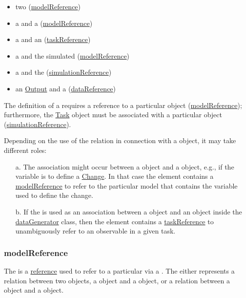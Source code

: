 \begin{itemize}
	\item{two \Models (\hyperref[sec:modelReference]{modelReference})}
	\item{a \Variable and a \Model (\hyperref[sec:modelReference]{modelReference})}
	\item{a \Variable and an \AbstractTask (\hyperref[sec:taskReference]{taskReference})}
	\item{a \Task and the simulated \Model (\hyperref[sec:modelReference]{modelReference})}
	\item{a \Task and the \Simulation (\hyperref[sec:simulationReference]{simulationReference})}
	\item{an \hyperref[class:output]{Output} and a \DataGenerator (\hyperref[sec:dataReference]{dataReference})}
\end{itemize}

The definition of a \Task requires a reference to a particular \Model object (\hyperref[sec:modelReference]{modelReference}); furthermore, the \hyperref[class:abstractTask]{Task} object must be associated with a particular \Simulation object (\hyperref[sec:simulationReference]{simulationReference}).

Depending on the use of the  relation in connection with a \Variable object, it may take different roles: 

\begin{enumerate}
\item[a.]{The  association might occur between a \Variable object and a \Model object, e.g., if the variable is to define a \hyperref[class:change]{Change}. 
In that case the  element contains a \hyperref[sec:modelReference]{modelReference} to refer to the particular model that contains the variable used to define the change.}

\item[b.]{If the  is used as an association between a \Variable object and an \AbstractTask object inside the \hyperref[class:dataGenerator]{dataGenerator} class, then the  element contains a \hyperref[sec:taskReference]{taskReference} to unambiguously refer to an observable in a given task.}
\end{enumerate}


\subsubsection{modelReference}
\label{sec:modelReference}
The  is a \hyperref[sec:reference]{reference} used to refer to a particular \Model via a \SIdRef. The  either represents a relation between two \Model objects, a \Variable object and a \Model object, or a relation between a \Task object and a \Model object.


